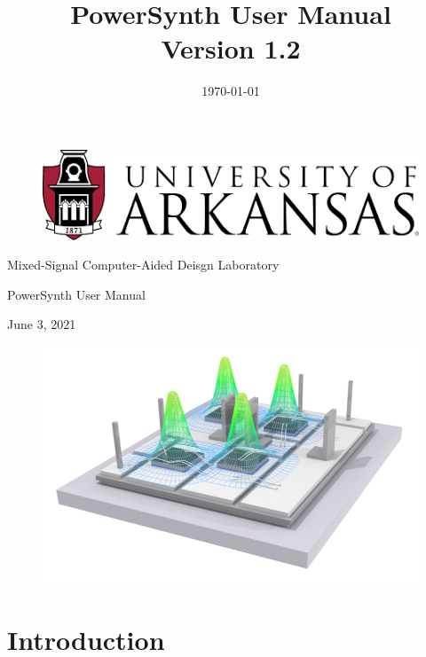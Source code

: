\documentclass[11pt]{article}
\date{\today}
\title{PowerSynth User Manual \\ Version 1.2}
\renewcommand\maketitle{}
\begin{document}
\maketitle
\begin{titlepage}
\begin{center}

\begin{figure}[h!]
  \centering
  \includegraphics[width=0.4\linewidth]{./figs/00_UarkLogo.png}
\end{figure}

{\Large Mixed-Signal Computer-Aided Deisgn Laboratory \par}
\vspace{2cm}
{\Huge PowerSynth User Manual \par}
\vspace{1cm}
{\large June 3, 2021 \par}
\vspace{1cm}

\begin{figure}[h!]
  \centering
  \includegraphics[width=\linewidth]{./figs/00_PS.png}
\end{figure}

\end{center}
\end{titlepage}

\tableofcontents
\pagebreak

\section{Introduction}
\label{sec-1}
\end{document}
